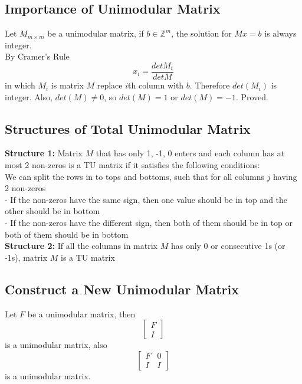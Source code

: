 				\subsection{Importance of Unimodular Matrix}
					Let $M_{m\times m}$ be a unimodular matrix, if $b\in \mathbb{Z}^m$, the solution for $Mx=b$ is always integer.\\
					 By Cramer's Rule
					\begin{equation}
						x_i = \frac{det{M_i}}{det{M}} 
					\end{equation}
					in which $M_i$ is matrix $M$ replace $i$th column with $b$. Therefore $det(M_i)$ is integer. Also, $det(M)\ne 0$, so $det(M)=1$ or $det(M)=-1$. Proved.

				\subsection{Structures of Total Unimodular Matrix}
					\textbf{Structure 1:}
						Matrix $M$ that has only 1, -1, 0 enters and each column has at most 2 non-zeros is a TU matrix if it satisfies the following conditions:\\
						We can split the rows in to tops and bottoms, such that for all columns $j$ having 2 non-zeros\\
						- If the non-zeros have the same sign, then one value should be in top and the other should be in bottom\\
						- If the non-zeros have the different sign, then both of them should be in top or both of them should be in bottom\\
					\textbf{Structure 2:}
						If all the columns in matrix $M$ has only 0 or consecutive 1s (or -1s), matrix $M$ is a TU matrix

				\subsection{Construct a New Unimodular Matrix}
					Let $F$ be a unimodular matrix, then
					\begin{equation}
						\left[\begin{matrix}F \\ I\end{matrix}\right] 
					\end{equation}
					is a unimodular matrix, also
					\begin{equation}
						\left[\begin{matrix}F & 0 \\ I & I\end{matrix}\right] 
					\end{equation}
					is a unimodular matrix.

